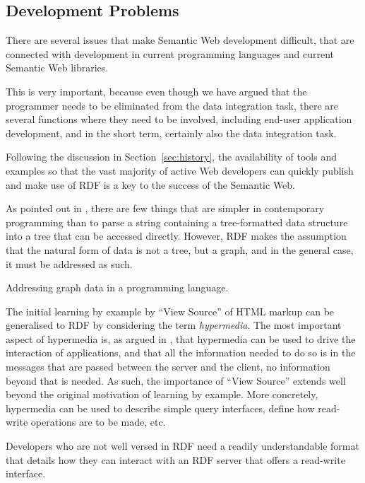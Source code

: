 \subsection{Development Problems}\label{sec:devproblems}

There are several issues that make Semantic Web development difficult,
that are connected with development in current programming languages
and current Semantic Web libraries.

This is very important, because even though we have argued that the
programmer needs to be eliminated from the data integration task,
there are several functions where they need to be involved, including
end-user application development, and in the short term, certainly
also the data integration task. 

Following the discussion in Section~\ref{sec:history}, the
availability of tools and examples so that the vast majority of active
Web developers can quickly publish and make use of RDF is a key to the
success of the Semantic Web.

As pointed out in \cite{darobin1}, there are few things that are
simpler in contemporary programming than to parse a string containing
a tree-formatted data structure into a tree that can be accessed
directly. However, RDF makes the assumption that the natural form of
data is not a tree, but a graph, and in the general case, it must be
addressed as such.

\begin{problem}\label{prob:graph}
Addressing graph data in a programming language.
\end{problem}

The initial learning by example by ``View Source'' of HTML markup can
be generalised to RDF by considering the term \emph{hypermedia}. The
most important aspect of hypermedia is, as argued in
\cite{Fielding_2000_Architectural-Styles}, that hypermedia can be used
to drive the interaction of applications, and that all the information
needed to do so is in the messages that are passed between the server
and the client, no information beyond that is needed. As such, the
importance of ``View Source'' extends well beyond the original
motivation of learning by example. More concretely, hypermedia can be
used to describe simple query interfaces, define how read-write
operations are to be made, etc. 

\begin{problem}\label{prob:lapis}
Developers who are not well versed in RDF need a readily
understandable format that details how they can interact with an RDF
server that offers a read-write interface.
\end{problem}


